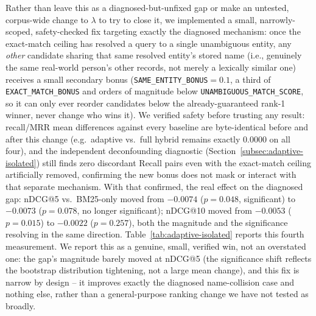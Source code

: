\documentclass[a4paper,twoside]{article}
\begin{document}
Rather than leave this as a diagnosed-but-unfixed gap or make an untested, corpus-wide change to $\lambda$ to try to close it, we implemented a small, narrowly-scoped, safety-checked fix targeting exactly the diagnosed mechanism: once the exact-match ceiling has resolved a query to a single unambiguous entity, any \emph{other} candidate sharing that same resolved entity's stored name (i.e., genuinely the same real-world person's other records, not merely a lexically similar one) receives a small secondary bonus (\texttt{SAME\_ENTITY\_BONUS}$=0.1$, a third of \texttt{EXACT\_MATCH\_BONUS} and orders of magnitude below \texttt{UNAMBIGUOUS\_MATCH\_SCORE}, so it can only ever reorder candidates below the already-guaranteed rank-1 winner, never change who wins it). We verified safety before trusting any result: recall/MRR mean differences against every baseline are byte-identical before and after this change (e.g.\ adaptive vs.\ full hybrid remains exactly $0.0000$ on all four), and the independent deconfounding diagnostic (Section~\ref{subsec:adaptive-isolated}) still finds zero discordant Recall pairs even with the exact-match ceiling artificially removed, confirming the new bonus does not mask or interact with that separate mechanism. With that confirmed, the real effect on the diagnosed gap: nDCG@5 vs.\ BM25-only moved from $-0.0074$ ($p=0.048$, significant) to $-0.0073$ ($p=0.078$, no longer significant); nDCG@10 moved from $-0.0053$ ($p=0.015$) to $-0.0022$ ($p=0.257$), both the magnitude and the significance resolving in the same direction. Table~\ref{tab:adaptive-isolated} reports this fourth measurement. We report this as a genuine, small, verified win, not an overstated one: the gap's magnitude barely moved at nDCG@5 (the significance shift reflects the bootstrap distribution tightening, not a large mean change), and this fix is narrow by design -- it improves exactly the diagnosed name-collision case and nothing else, rather than a general-purpose ranking change we have not tested as broadly.
\end{document}
